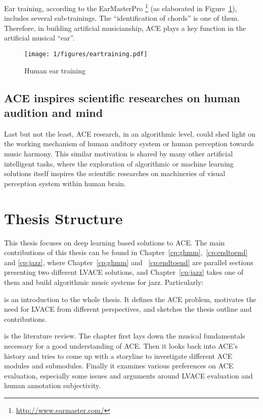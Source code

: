Ear training, according to the EarMasterPro \footnote{\url{http://www.earmaster.com/}} (as elaborated in Figure~\ref{fig:1-eartraining}), includes several sub-trainings. The ``identification of chords'' is one of them. Therefore, in building artificial musicianship, ACE plays a key function in the artificial musical ``ear''.
\begin{figure}[htb]
\centering
\texttt{[image: 1/figures/eartraining.pdf]}
\caption{Human ear training}
\label{fig:1-eartraining}
\end{figure}

\subsection{ACE inspires scientific researches on human audition and mind}
Last but not the least, ACE research, in an algorithmic level, could shed light on the working mechanism of human auditory system or human perception towards music harmony. This similar motivation is shared by many other artificial intelligent tasks\cite{lecun1995convolutional,hinton1995wake}, where the exploration of algorithmic or machine learning solutions itself inspires the scientific researches on machineries of visual perception system within human brain.

\section{Thesis Structure} \label{sec:1-outline}
This thesis focuses on deep learning based solutions to ACE. The main contributions of this thesis can be found in Chapter~\ref{cp:ghmm},~\ref{cp:endtoend} and \ref{cp:jazz}, where Chapter~\ref{cp:ghmm} and ~\ref{cp:endtoend} are parallel sections presenting two different LVACE solutions, and Chapter~\ref{cp:jazz} takes one of them and build algorithmic music systems for jazz. Particularly:

 is an introduction to the whole thesis. It defines the ACE problem, motivates the need for LVACE from different perspectives, and sketches the thesis outline and contributions.

 is the literature review. The chapter first lays down the musical fundamentals necessary for a good understanding of ACE. Then it looks back into ACE's history and tries to come up with a storyline to investigate different ACE modules and submodules. Finally it examines various preferences on ACE evaluation, especially some issues and arguments around LVACE evaluation and human annotation subjectivity.


